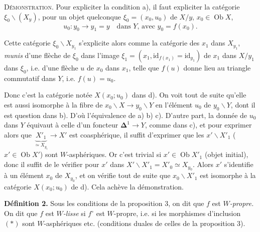 \documentclass[11pt]{article}
\newcommand{\printedpage}[1]{\marginpar{\footnotesize p.~#1}}
\newcommand{\msp}[1]{\marginpar{\footnotesize [#1]}}
\newcommand{\Ob}{\operatorname{Ob}}
\begin{document}
\msp{page 27}\textsc{Démonstration.} Pour expliciter la condition a), il faut expliciter la catégorie $\xi_0\backslash(X_y)$, pour un objet quelconque $\xi_0 = (x_0, u_0)$ de $X/y$, $x_0 \in \Ob X$,
\[
u_0 : y_0 \longrightarrow y_1 = y \quad \text{dans $Y$, avec $y_0 = f(x_0)$.}
\]

Cette catégorie $\xi_0\backslash X_{y_1}$ s'explicite alors comme la catégorie des $x_1$ dans $X_{y_1}$, \textit{munis} d'une flèche de $\xi_0$ dans l'image $\xi_1 = (x_1, \mathrm{id}_{f(x_1)} = \mathrm{id}_{y_1})$ de $x_1$ dans $X/y_1$ dans $\xi_0$, i.e. d'une flèche $u$ de $x_0$ dans $x_1$, telle que $f(u)$ donne lieu au triangle commutatif dans $Y$, i.e. $f(u) = u_0$. %

\begin{center}
\end{center}

Donc c'est la catégorie notée $X(x_0;u_0)$ dans d). On voit tout de suite qu'elle est aussi isomorphe à la fibre de $x_0\backslash X \longrightarrow y_0\backslash Y$ en l'élément $u_0$ de $y_0\backslash Y$, dont il est question dans b). D'où l'équivalence de a) b) c). D'autre part, la donnée de $u_0$ dans $Y$ équivaut à celle d'un foncteur $\mathbf{\Delta}^1 \longrightarrow Y$, comme dans c), et pour exprimer alors que $\underbrace{X'_1}_{\simeq X_{y_1}} \longrightarrow X'$ est coasphérique, il suffit d'exprimer que les $x'\backslash X'_1$ ($x' \in \Ob X'$) sont $W$-asphériques. Or c'est trivial si $x' \in \Ob X'_1$ (objet initial), donc il suffit de le vérifier pour $x'$ dans $X'\backslash X'_1 = X'_0 \simeq X_{y_0}$. Alors $x'$ s'identifie à un élément $x_0$ de $X_{y_0}$, et on vérifie tout de suite que $x_0\backslash X'_1$ est isomorphe à la catégorie $X(x_0;u_0)$ de d). Cela achève la démonstration.

\printedpage{23}

\msp{page 28}\textbf{Définition 2.} Sous les conditions de la proposition 3, on dit que $f$ est \textit{$W$-propre.} On dit que $f$ est \textit{$W$-lisse} si $f^{\circ}$ est $W$-propre, i.e. si les morphismes d'inclusion $(*)$ sont $W$-asphériques etc. (conditions duales de celles de la proposition 3).
\end{document}
